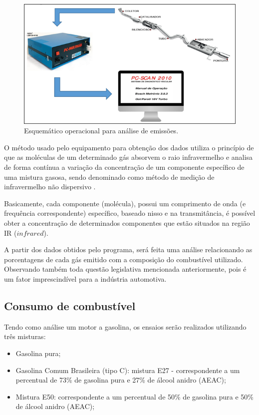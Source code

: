 \begin{figure}[h!]
	\centering
	\includegraphics[keepaspectratio=true,scale= 1.0]{figuras/esquematico-operacional.png}
	\caption{Esquemático operacional para análise de emissões.}
	\label{esquematico-operacional}
\end{figure}

O método usado pelo equipamento para obtenção dos dados utiliza o princípio de que as moléculas de um determinado gás absorvem o raio infravermelho e analisa de forma contínua a variação da concentração de um componente específico de uma mistura gasosa, sendo denominado como método de medição de infravermelho não dispersivo \cite{nereu}.

Basicamente, cada componente (molécula), possui um comprimento de onda (e frequência correspondente) específico, baseado nisso e na transmitância, é possível obter a concentração de determinados componentes que estão situados na região IR ($infrared$).

A partir dos dados obtidos pelo programa, será feita uma análise relacionando as porcentagens de cada gás emitido com a composição do combustível utilizado. Observando também toda questão legislativa mencionada anteriormente, pois é um fator imprescindível para a indústria automotiva.

\subsection{Consumo de combustível}

Tendo como análise um motor a gasolina, os ensaios serão realizados utilizando três misturas:

\begin{itemize}
\item Gasolina pura;
\item Gasolina Comum Brasileira (tipo C): mistura E27 - correspondente a um percentual de 73\% de gasolina pura e 27\% de álcool anidro (AEAC);
\item Mistura E50: correspondente a um percentual de 50\% de gasolina pura e 50\% de álcool anidro (AEAC);
\end{itemize}


